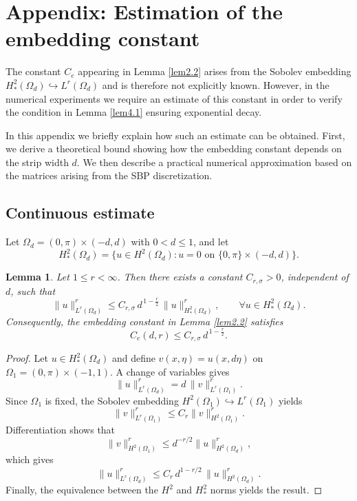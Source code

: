 \documentclass[12pt]{article}
\numberwithin{equation}{section}
\newtheorem{lemma}[theorem]{Lemma}
\begin{document}
\appendix
\section{Appendix: Estimation of the embedding constant}\label{app1}

The constant $C_e$ appearing in Lemma \ref{lem2.2} arises from the Sobolev
embedding $H_*^2(\Omega_d)\hookrightarrow L^r(\Omega_d)$ and is therefore
not explicitly known. However, in the numerical experiments we require
an estimate of this constant in order to verify the condition in
Lemma \ref{lem4.1} ensuring exponential decay.

In this appendix we briefly explain how such an estimate can be obtained.
First, we derive a theoretical bound showing how the embedding constant
depends on the strip width $d$. We then describe a practical numerical
approximation based on the matrices arising from the SBP discretization.

\subsection*{Continuous estimate}

Let $\Omega_d=(0,\pi)\times(-d,d)$ with $0<d\le1$, and let
\[
H_*^2(\Omega_d)=\{u\in H^2(\Omega_d): u=0 \text{ on } \{0,\pi\}\times(-d,d)\}.
\]

\begin{lemma}
Let $1\le r<\infty$. Then there exists a constant $C_{r,\sigma}>0$,
independent of $d$, such that
\[
\|u\|_{L^r(\Omega_d)}^r
\le C_{r,\sigma}\, d^{\,1-\frac r2}\,
\|u\|_{H_*^2(\Omega_d)}^r,
\qquad \forall u\in H_*^2(\Omega_d).
\]
Consequently, the embedding constant in Lemma \ref{lem2.2} satisfies
\[
C_e(d,r)\le C_{r,\sigma}\, d^{\,1-\frac r2}.
\]
\end{lemma}

\begin{proof}
Let $u\in H_*^2(\Omega_d)$ and define $v(x,\eta)=u(x,d\eta)$ on
$\Omega_1=(0,\pi)\times(-1,1)$. A change of variables gives
\[
\|u\|_{L^r(\Omega_d)}^r
= d\,\|v\|_{L^r(\Omega_1)}^r.
\]
Since $\Omega_1$ is fixed, the Sobolev embedding
$H^2(\Omega_1)\hookrightarrow L^r(\Omega_1)$ yields
\[
\|v\|_{L^r(\Omega_1)}^r \le C_r \|v\|_{H^2(\Omega_1)}^r.
\]
Differentiation shows that
\[
\|v\|_{H^2(\Omega_1)}^r \le d^{-r/2}\|u\|_{H^2(\Omega_d)}^r,
\]
which gives
\[
\|u\|_{L^r(\Omega_d)}^r
\le C_r\, d^{1-r/2}\,\|u\|_{H^2(\Omega_d)}^r.
\]
Finally, the equivalence between the $H^2$ and $H_*^2$ norms
yields the result.
\end{proof}
\end{document}
